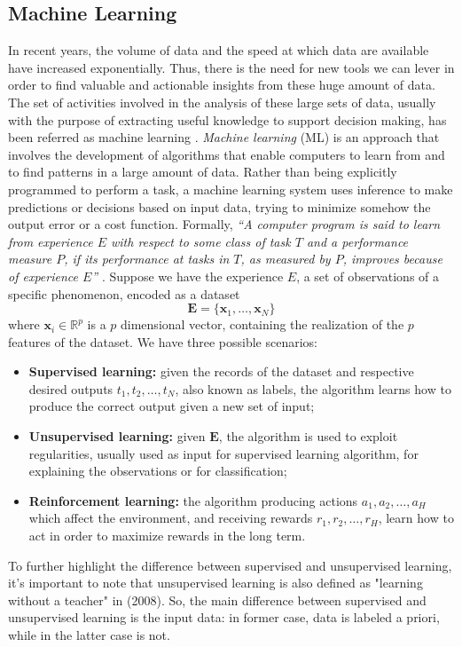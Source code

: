 \subsection{Machine Learning}
\label{subsec:ml}
In recent years, the volume of data and the speed at which data are available have increased exponentially. Thus, there is the need for new tools we can lever in order to find valuable and actionable insights from these huge amount of data. The set of activities involved in the analysis of these large sets of data, usually with the purpose of extracting useful knowledge to support decision making, has been referred as machine learning \cite{vercellis_business_2009}. \emph{Machine learning} (ML) is an approach that involves the development of algorithms that enable computers to learn from and to find patterns in a large amount of data. Rather than being explicitly programmed to perform a task, a machine learning system uses inference to make predictions or decisions based on input data, trying to minimize somehow the output error or a cost function. Formally, \textit{“A computer program is said to learn from experience $E$ with respect to some class of task $T$ and a performance measure $P$, if its performance at tasks in $T$, as measured by $P$, improves because of experience $E$”} \cite{zaki_data_2020, pierluca_lanzi_data_2021}. Suppose we have the experience $E$, a set of observations of a specific phenomenon, encoded as a dataset
\begin{equation}
    \label{eq:dataset}
    \mathbf{E}=\{\mathbf{x}_1, \dots, \mathbf{x}_N\} 
\end{equation}
where $\mathbf{x}_i\in \mathbb{R}^p$ is a $p$ dimensional vector, containing the realization of the $p$ features of the dataset. We have three possible scenarios:
\begin{itemize}
    \item \textbf{Supervised learning:} given the records of the dataset and respective desired outputs $t_1, t_2, \dots, t_N$, also known as labels, the algorithm learns how to produce the correct output given a new set of input;
    \item \textbf{Unsupervised learning:} given $\mathbf{E}$, the algorithm is used to exploit regularities, usually used as input for supervised learning algorithm, for explaining the observations or for classification;
    \item \textbf{Reinforcement learning:} the algorithm producing actions $a_1, a_2, \dots, a_H$ which affect the environment, and receiving rewards $r_1, r_2, \dots, r_H$, learn how to act in order to maximize rewards in the long term.
\end{itemize}
To further highlight the difference between supervised and unsupervised learning, it's important to note that unsupervised learning is also defined as "learning without a teacher" in \citeauthor{tibshirani_elements_2008} (2008). So, the main difference between supervised and unsupervised learning is the input data: in former case, data is labeled a priori, while in the latter case is not. 

